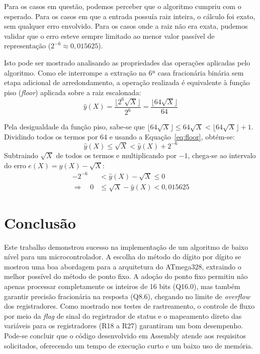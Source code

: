 \documentclass[conference]{IEEEtran}
\begin{document}
Para os casos em questão, podemos perceber que o algoritmo cumpriu com o esperado. Para os casos em que a entrada possuía raiz inteira, o cálculo foi exato, sem qualquer erro envolvido. Para os casos onde a raiz não era exata, pudemos validar que o erro esteve sempre limitado ao menor valor passível de representação ($2^{-6} \approx 0,015625$).

Isto pode ser mostrado analisando as propriedades das operações aplicadas pelo algoritmo. Como ele interrompe a extração na 6ª casa fracionária binária sem etapa adicional de arredondamento, a operação realizada é equivalente à função piso (\textit{floor}) aplicada sobre a raiz escalonada:
\begin{equation}
	\hat{y}(X) = \frac{\lfloor 2^6 \sqrt{X} \rfloor}{2^6} = \frac{\lfloor 64\sqrt{X} \rfloor}{64}
	\label{eq:floor}
\end{equation}

Pela desigualdade da função piso, sabe-se que $\lfloor 64\sqrt{X} \rfloor \le 64\sqrt{X} < \lfloor 64\sqrt{X} \rfloor + 1$. Dividindo todos os termos por $64$ e usando a Equação~\ref{eq:floor}, obtém-se:
\begin{equation}
	\hat{y}(X) \le \sqrt{X} < \hat{y}(X) + 2^{-6}
	\label{eq:piso_div}
\end{equation}
Subtraindo $\sqrt{X}$ de todos os termos e multiplicando por $-1$, chega-se ao intervalo do erro $e(X) = \hat{y}(X) - \sqrt{X}$:
\begin{align}
	-2^{-6} &< \hat{y}(X) - \sqrt{X} \le 0 \nonumber \\
	\Rightarrow\quad 0 &\le \sqrt{X} - \hat{y}(X) < 0{,}015625
	\label{eq:cota_erro}
\end{align}



\section{Conclusão}
Este trabalho demonstrou sucesso na implementação de um algoritmo de baixo nível para um microcontrolador. A escolha do método do dígito por dígito se mostrou uma boa abordagem para a arquitetura do ATmega328, extraindo o melhor possível do método de ponto fixo. A adoção do ponto fixo permitiu não apenas processar completamente os inteiros de 16 bits (Q16.0), mas também garantir precisão fracionária na resposta (Q8.6), chegando no limite de \textit{overflow} dos registradores. Como mostrado nos testes de rastreamento, o controle de fluxo por meio da \textit{flag} de sinal do registrador de status e o mapeamento direto das variáveis para os registradores (R18 a R27) garantiram um bom desempenho. Pode-se concluir que o código desenvolvido em Assembly atende aos requisitos solicitados, oferecendo um tempo de execução curto e um baixo uso de memória.
\end{document}
